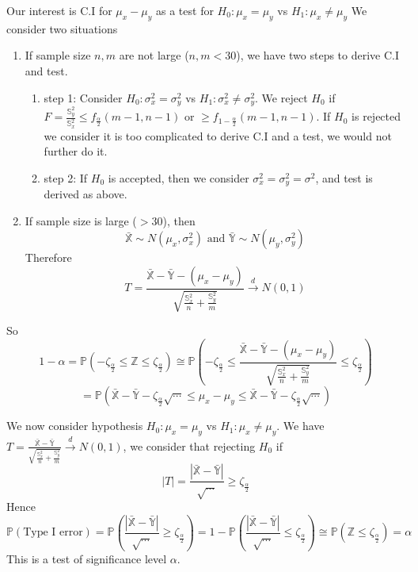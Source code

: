 Our interest is C.I for $\mu_x - \mu_y$ as a test for $H_0: \mu_x = \mu_y$ vs $H_1:\mu_x\neq\mu_y$ We consider two situations
\begin{enumerate}
\item If sample size $n, m$ are not large ($n, m < 30$), we have two steps to derive C.I and test.
  \begin{enumerate}
  \item step 1: Consider $H_0: \sigma_x^2 = \sigma_y^2$ vs $H_1: \sigma_x^2 \neq \sigma_y^2$. We reject $H_0$ if $F = \frac{\mathbb{S}_y^2}{\mathbb{S}_x^2} \leq f_{\frac{\alpha}{2}}(m-1, n-1)$ or $\geq f_{1-\frac{\alpha}{2}}(m-1, n-1)$. If $H_0$ is rejected we consider it is too complicated to derive C.I and a test, we would not further do it. 
  \item  step 2: If $H_0$ is accepted, then we consider $\sigma_x^2 = \sigma_y^2 = \sigma^2$, and test is derived as above.
  \end{enumerate}
\item If sample size is large ($> 30$), then
$$\bar{\mathbb{X}} \sim N(\mu_x, \sigma_x^2) \text{ and } \bar{\mathbb{Y}} \sim N(\mu_y, \sigma_y^2)$$
Therefore
$$T = \frac{\bar{\mathbb{X}} - \bar{\mathbb{Y}} - (\mu_x - \mu_y)}{\sqrt{\frac{\mathbb{S}_x^2}{n} + \frac{\mathbb{S}_y^2}{m}}} \overset{d}{\to} N(0, 1)$$
\end{enumerate}

So
$$1-\alpha = \mathbb{P}(-\zeta_{\frac{\alpha}{2}} \leq \mathbb{Z} \leq \zeta_{\frac{\alpha}{2}})
\cong \mathbb{P}(-\zeta_{\frac{\alpha}{2}} \leq \frac{\bar{\mathbb{X}} - \bar{\mathbb{Y}} - (\mu_x - \mu_y)}{\sqrt{\frac{\mathbb{S}_x^2}{n} + \frac{\mathbb{S}_y^2}{m}}}  \leq \zeta_{\frac{\alpha}{2}})$$
$$= \mathbb{P}( \bar{\mathbb{X}} - \bar{\mathbb{Y}} - \zeta_{\frac{\alpha}{2}} \sqrt{\cdots} \leq \mu_x - \mu_y \leq \bar{\mathbb{X}} - \bar{\mathbb{Y}} - \zeta_{\frac{\alpha}{2}} \sqrt{\cdots} )$$

We now consider hypothesis $H_0: \mu_x = \mu_y$ vs $H_1: \mu_x \neq \mu_y$. We have $T = \frac{\bar{\mathbb{X}} - \bar{\mathbb{Y}} }{\sqrt{\frac{\mathbb{S}_x^2}{n} + \frac{\mathbb{S}_y^2}{m}}} \overset{d}{\to} N(0, 1) $, we consider that rejecting $H_0$ if 
$$|T| = \frac{|\bar{\mathbb{X}} - \bar{\mathbb{Y}}|}{\sqrt{\cdots}} \geq \zeta_{\frac{\alpha}{2}} $$
Hence 
$$\mathbb{P}(\text{Type I error}) = \mathbb{P}( \frac{|\bar{\mathbb{X}} - \bar{\mathbb{Y}}|}{\sqrt{\cdots}} \geq \zeta_{\frac{\alpha}{2}} ) 
= 1 - \mathbb{P}( \frac{|\bar{\mathbb{X}} - \bar{\mathbb{Y}}|}{\sqrt{\cdots}} \leq \zeta_{\frac{\alpha}{2}} )
\cong \mathbb{P} (\mathbb{Z} \leq  \zeta_{\frac{\alpha}{2}}) = \alpha$$
This is a test of significance level $\alpha$.

